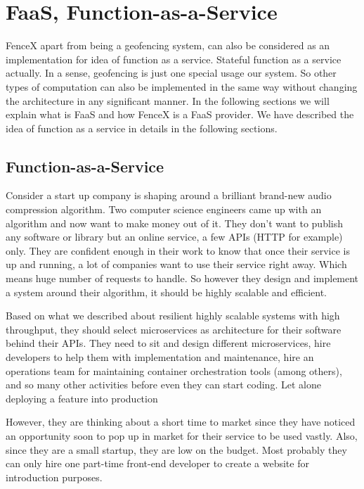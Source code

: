 \documentclass[a4]{report}
\begin{document}
    \chapter{FaaS, Function-as-a-Service}
    FenceX apart from being a geofencing system, can also be considered as an implementation for idea of function as
    a service\cite{whatisfaas}.
    Stateful function as a service actually.
    In a sense, geofencing is just one special usage our system.
    So other types of computation can also be implemented in the same way without changing the architecture in any
    significant manner.
    In the following sections we will explain what is FaaS and how FenceX is a FaaS provider.
    We have described the idea of function as a service in details in the following sections.


    \section{Function-as-a-Service}
    Consider a start up company is shaping around a brilliant brand-new audio compression algorithm.
    Two computer science engineers came up with an algorithm and now want to make money out of it.
    They don't want to publish any software or library but an online service, a few APIs (HTTP for example) only.
    They are confident enough in their work to know that once their service is up and running, a lot of companies
    want to use their service right away.
    Which means huge number of requests to handle.
    So however they design and implement a system around their algorithm, it should be highly scalable and efficient.

    Based on what we described about resilient highly scalable systems with high throughput, they should select
    microservices as architecture for their software behind their APIs.
    They need to sit and design different microservices, hire developers to help them with implementation and
    maintenance, hire an operations team for maintaining container orchestration tools (among others), and so many
    other activities before even they can start coding.
    Let alone deploying a feature into production

    However, they are thinking about a short time to market since they have noticed an opportunity soon to pop up in
    market for their service to be used vastly.
    Also, since they are a small startup, they are low on the budget.
    Most probably they can only hire one part-time front-end developer to create a website for introduction
    purposes.
\end{document}

